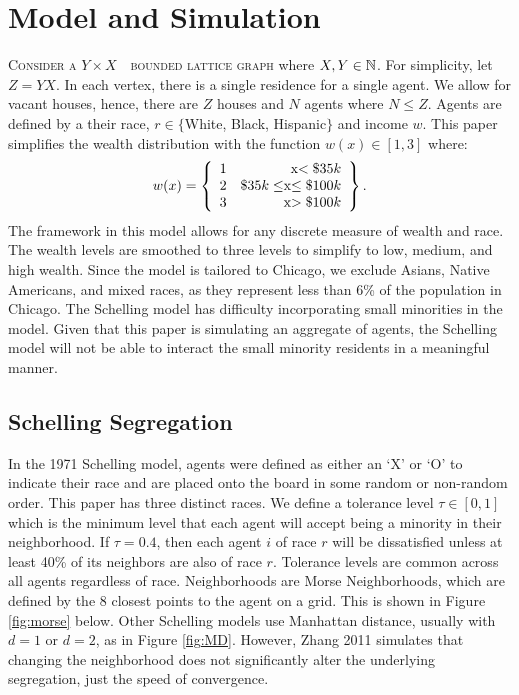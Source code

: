 \begin{savequote}[75mm]

\end{savequote}

\chapter{Model and Simulation}
{\lettrine[lines=3,slope=1pt,nindent=1pt,]{\textcolor{SchoolColor}{C}}{onsider a $Y \times X$\ \ bounded lattice graph} where $X,Y\in\mathbb{N}$. For simplicity, let $Z = YX$. In each vertex, there is a single residence for a single agent. We allow for vacant houses, hence, there are $Z$ houses and $N$ agents where $N \leq Z$. Agents are defined by a their race, $r\in\{$White, Black, Hispanic$\}$ and income $w$. This paper simplifies the wealth distribution with the function $w(x)\in[1,3]$ where:  
\begin{equation}
\label{eq:w}
    w(x) = \left\{\begin{array}{lr}
        1 & $x$<\$35k\\
        2 & \$35k \leq $x$ \leq \$100k\\
        3 & $x$ >\$100k
        \end{array}\right\}.
\end{equation}
The framework in this model allows for any discrete measure of wealth and race. The wealth levels are smoothed to three levels to simplify to low, medium, and high wealth. Since the model is tailored to Chicago, we exclude Asians, Native Americans, and mixed races, as they represent less than 6\% of the population in Chicago. The Schelling model has difficulty incorporating small minorities in the model. Given that this paper is simulating an aggregate of agents, the Schelling model will not be able to interact the small minority residents in a meaningful manner.

\section{Schelling Segregation}
In the 1971 Schelling model, agents were defined as either an `X' or `O' to indicate their race and are placed onto the board in some random or non-random order. This paper has three distinct races. We define a tolerance level $\tau\in[0,1]$ which is the minimum level that each agent will accept being a minority in their neighborhood. If $\tau = 0.4$, then each agent $i$ of race $r$ will be dissatisfied unless at least 40\% of its neighbors are also of race $r$. Tolerance levels are common across all agents regardless of race. Neighborhoods are Morse Neighborhoods, which are defined by the 8 closest points to the agent on a grid. This is shown in Figure \ref{fig:morse} below. Other Schelling models use Manhattan distance, usually with $d=1$ or $d=2$, as in Figure \ref{fig:MD}. However, Zhang 2011 simulates that changing the neighborhood does not significantly alter the underlying segregation, just the speed of convergence\cite{zhang11}. 

}
